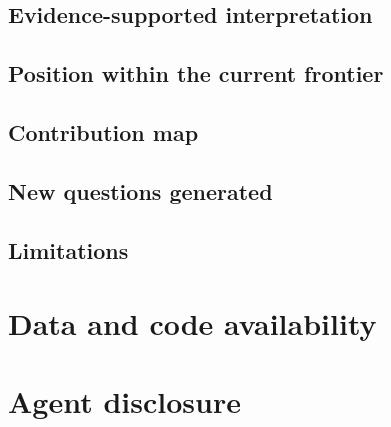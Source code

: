 \documentclass[11pt]{article}
\begin{document}
\subsection{Evidence-supported interpretation}
\subsection{Position within the current frontier}
\subsection{Contribution map}
\subsection{New questions generated}
\subsection{Limitations}

\section*{Data and code availability}
\section*{Agent disclosure}




\appendix
\printclaimledger
\end{document}
